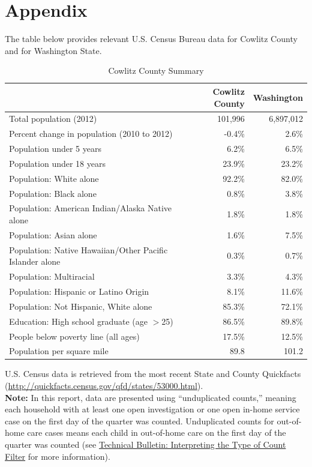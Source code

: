 \documentclass{article}\usepackage[]{graphicx}\usepackage[]{color}
\begin{document}
\vspace{-18pt}

\newpage

\section{Appendix}

The table below provides relevant U.S. Census Bureau data for Cowlitz County and for Washington State. 
\nopagebreak[3]
\begin{table}[ht]
\centering
\caption{Cowlitz County Summary} 
\begin{tabular}{lrr}
  \toprule
 & Cowlitz County & Washington \\ 
  \midrule
Total population (2012) & 101,996 & 6,897,012 \\ 
  Percent change in population (2010 to 2012) & -0.4\% & 2.6\% \\ 
  Population under 5 years & 6.2\% & 6.5\% \\ 
  Population under 18 years & 23.9\% & 23.2\% \\ 
  Population: White alone & 92.2\% & 82.0\% \\ 
  Population: Black alone & 0.8\% & 3.8\% \\ 
  Population: American Indian/Alaska Native alone & 1.8\% & 1.8\% \\ 
  Population: Asian alone & 1.6\% & 7.5\% \\ 
  Population: Native Hawaiian/Other Pacific Islander alone & 0.3\% & 0.7\% \\ 
  Population: Multiracial & 3.3\% & 4.3\% \\ 
  Population: Hispanic or Latino Origin & 8.1\% & 11.6\% \\ 
  Population: Not Hispanic, White alone & 85.3\% & 72.1\% \\ 
  Education: High school graduate (age $>$25) & 86.5\% & 89.8\% \\ 
  People below poverty line (all ages) & 17.5\% & 12.5\% \\ 
  Population per square mile & 89.8 & 101.2 \\ 
   \bottomrule
\end{tabular}
\end{table}



U.S. Census data is retrieved from the most recent State and County Quickfacts (\href{http://quickfacts.census.gov/qfd/states/53000.html}{http://quickfacts.census.gov/qfd/states/53000.html}).\\

\textbf{Note:} In this report, data are presented using ``unduplicated counts,'' meaning each household with at least one open investigation or one open in-home service case on the first day of the quarter was counted. Unduplicated counts for out-of-home care cases means each child in out-of-home care on the first day of the quarter was counted (see \href{http://http://www.partnersforourchildren.org/publications/using-different-count-types-data-portal}{Technical Bulletin: Interpreting the Type of Count Filter} for more information).  
\end{document}
